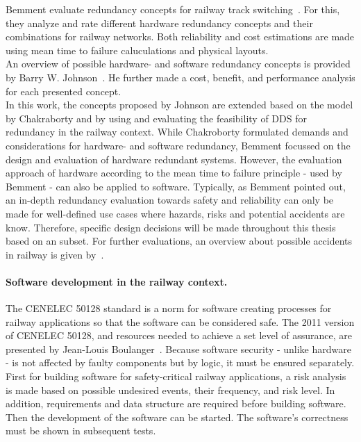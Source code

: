 Bemment \etal evaluate redundancy concepts for railway track switching~\cite{BemmentEvaluationOfRedundancy}.
For this, they analyze and rate different hardware redundancy concepts and their combinations for railway networks.
Both reliability and cost estimations are made using mean time to failure caluculations and physical layouts.
\\

An overview of possible hardware- and software redundancy concepts is provided by Barry W. Johnson~\cite{BarryFaultToleranceAnalysis}.
He further made a cost, benefit, and performance analysis for each presented concept.
\\

In this work, the concepts proposed by Johnson are extended based on the model by Chakraborty and by using and evaluating the feasibility of \gls*{DDS} for redundancy in the railway context.
While Chakroborty formulated demands and considerations for hardware- and software redundancy, Bemment \etal focussed on the design and evaluation of hardware redundant systems.
However, the evaluation approach of hardware according to the mean time to failure principle - used by Bemment \etal - can also be applied to software.
Typically, as Bemment \etal pointed out, an in-depth redundancy evaluation towards safety and reliability can only be made for well-defined use cases where hazards, risks and potential accidents are know.
Therefore, specific design decisions will be made throughout this thesis based on an  subset.
For further evaluations, an overview about possible accidents in railway is given by~\cite{ERTMSRailwayAccidents}.


\paragraph{Software development in the railway context.}
The CENELEC 50128 standard is a norm for software creating processes for railway applications so that the software can be considered safe.
The 2011 version of CENELEC 50128, and resources needed to achieve a set level of assurance, are presented by Jean-Louis Boulanger~\cite{BoulangerStandards}.
Because software security - unlike hardware - is not affected by faulty components but by logic, it must be ensured separately.
First for building software for safety-critical railway applications, a risk analysis is made based on possible undesired events, their frequency, and risk level.
In addition, requirements and data structure are required before building software.
Then the development of the software can be started.
The software's correctness must be shown in subsequent tests.
\\

